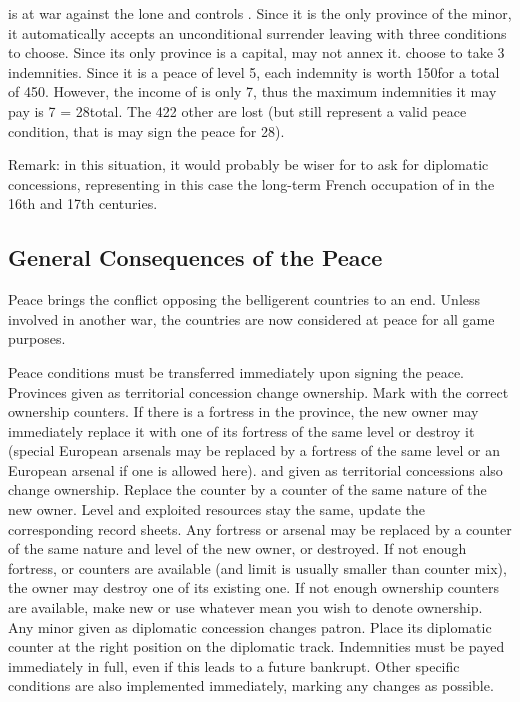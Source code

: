 \begin{exemple}
  \FRA is at war against the lone \paysLorraine and controls
  \provinceLorraine. Since it is the only province of the minor, it
  automatically accepts an unconditional surrender leaving \FRA with three
  conditions to choose. Since its only province is a capital, \FRA may not
  annex it. \FRA choose to take 3 indemnities. Since it is a peace of level 5,
  each indemnity is worth 150\ducats for a total of 450\ducats. However, the
  income of \paysLorraine is only 7\ducats, thus the maximum indemnities it
  may pay is 7  = 28\ducats total. The 422 other \ducats are
  lost (but still represent a valid peace condition, that is \FRA may sign the
  peace for 28\ducats).

  Remark: in this situation, it would probably be wiser for \FRA to ask for
  diplomatic concessions, representing in this case the long-term French
  occupation of \paysLorraine in the 16th and 17th centuries.
\end{exemple}

\subsection{General Consequences of the Peace}
\aparag Peace brings the conflict opposing the belligerent countries to an
end.
\bparag Unless involved in another war, the countries are now considered at
peace for all game purposes.

 Peace conditions must be transferred immediately
upon signing the peace.
\bparag Provinces given as territorial concession change ownership. Mark with
the correct ownership counters. If there is a fortress in the province, the new
owner may immediately replace it with one of its fortress of the same level or
destroy it (special European arsenals may be replaced by a fortress of the
same level or an European arsenal if one is allowed here).
\bparag \COL and \TP given as territorial concessions also change
ownership. Replace the counter by a counter of the same nature of the new
owner. Level and exploited resources stay the same, update the corresponding
record sheets. Any fortress or arsenal may be replaced by a counter of the
same nature and level of the new owner, or destroyed.
\bparag If not enough fortress, \COL or \TP counters are available (\COL and
\TP limit is usually smaller than counter mix), the owner may destroy one of
its existing one. If not enough ownership counters are available, make new or
use whatever mean you wish to denote ownership.
\bparag Any minor given as diplomatic concession changes patron. Place its
diplomatic counter at the right position on the diplomatic track.
\bparag Indemnities must be payed immediately in full, even if this leads to a
future bankrupt.
\bparag Other specific conditions are also implemented immediately, marking
any changes as possible.

